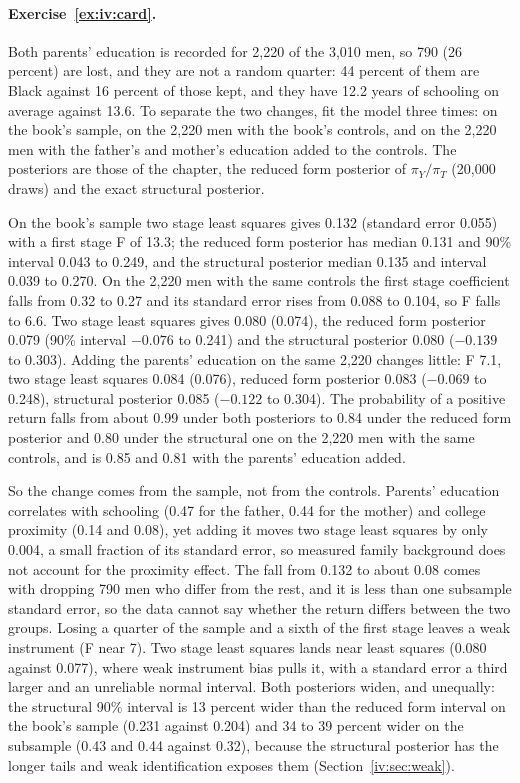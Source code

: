 \paragraph{Exercise~\ref{ex:iv:card}.} Both parents' education is recorded for 2,220 of the 3,010 men, so 790 (26 percent) are lost, and they are not a random quarter: 44 percent of them are Black against 16 percent of those kept, and they have 12.2 years of schooling on average against 13.6. To separate the two changes, fit the model three times: on the book's sample, on the 2,220 men with the book's controls, and on the 2,220 men with the father's and mother's education added to the controls. The posteriors are those of the chapter, the reduced form posterior of $\pi_Y/\pi_T$ (20,000 draws) and the exact structural posterior.

On the book's sample two stage least squares gives 0.132 (standard error 0.055) with a first stage F of 13.3; the reduced form posterior has median 0.131 and 90\% interval 0.043 to 0.249, and the structural posterior median 0.135 and interval 0.039 to 0.270. On the 2,220 men with the same controls the first stage coefficient falls from 0.32 to 0.27 and its standard error rises from 0.088 to 0.104, so F falls to 6.6. Two stage least squares gives 0.080 (0.074), the reduced form posterior 0.079 (90\% interval $-0.076$ to 0.241) and the structural posterior 0.080 ($-0.139$ to 0.303). Adding the parents' education on the same 2,220 changes little: F 7.1, two stage least squares 0.084 (0.076), reduced form posterior 0.083 ($-0.069$ to 0.248), structural posterior 0.085 ($-0.122$ to 0.304). The probability of a positive return falls from about 0.99 under both posteriors to 0.84 under the reduced form posterior and 0.80 under the structural one on the 2,220 men with the same controls, and is 0.85 and 0.81 with the parents' education added.

So the change comes from the sample, not from the controls. Parents' education correlates with schooling (0.47 for the father, 0.44 for the mother) and college proximity (0.14 and 0.08), yet adding it moves two stage least squares by only 0.004, a small fraction of its standard error, so measured family background does not account for the proximity effect. The fall from 0.132 to about 0.08 comes with dropping 790 men who differ from the rest, and it is less than one subsample standard error, so the data cannot say whether the return differs between the two groups. Losing a quarter of the sample and a sixth of the first stage leaves a weak instrument (F near 7). Two stage least squares lands near least squares (0.080 against 0.077), where weak instrument bias pulls it, with a standard error a third larger and an unreliable normal interval. Both posteriors widen, and unequally: the structural 90\% interval is 13 percent wider than the reduced form interval on the book's sample (0.231 against 0.204) and 34 to 39 percent wider on the subsample (0.43 and 0.44 against 0.32), because the structural posterior has the longer tails and weak identification exposes them (Section~\ref{iv:sec:weak}).

